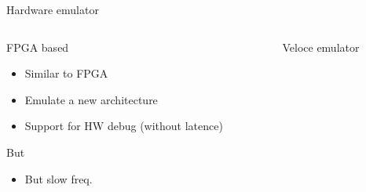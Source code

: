 %
\begin{Frame}{Hardware emulator}
  \begin{columns}[t]
    \begin{column}{\BW} %
      \begin{block}{FPGA based}
        \begin{itemize}
        \item Similar to FPGA
        \item Emulate a new architecture
        \item Support for HW debug (without latence)
        \end{itemize}
      \end{block}
      \begin{alertblock}{But}
        \begin{itemize}
        \item But slow freq.
        \end{itemize}
      \end{alertblock}
    \end{column}
    
    \begin{column}{\BW} %
      \begin{block}{Veloce emulator}
      \end{block}   
    \end{column}
  \end{columns}  
\end{Frame}


